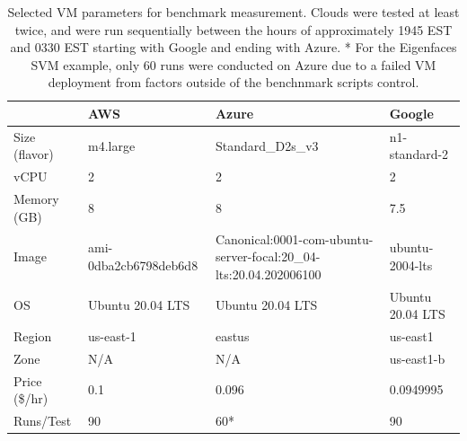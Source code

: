 \begin{table}
  
\caption{Selected VM parameters for benchmark measurement.
Clouds were tested at least twice, and were run sequentially between the
hours of approximately 1945 EST and 0330 EST starting with Google and
ending with Azure. * For the Eigenfaces SVM example, only 60 runs were
conducted on Azure due to a failed VM deployment from factors outside of
the benchnmark scripts control.}
\label{tab:1}

\begin{tabular}[]{@{}llll@{}}
\toprule
\begin{minipage}[b]{0.13\columnwidth}\raggedright
\strut
\end{minipage} & \begin{minipage}[b]{0.17\columnwidth}\raggedright
AWS\strut
\end{minipage} & \begin{minipage}[b]{0.47\columnwidth}\raggedright
Azure\strut
\end{minipage} & \begin{minipage}[b]{0.12\columnwidth}\raggedright
Google\strut
\end{minipage}\tabularnewline
\midrule
Size (flavor)
& 
m4.large
& 
Standard\_D2s\_v3 & 
n1-standard-2
\tabularnewline
vCPU & 2 & 2 & 2
\tabularnewline
Memory (GB) & 8 & 8 & 7.5
\tabularnewline
Image & ami-0dba2cb6798deb6d8
& \begin{minipage}[t]{0.80\columnwidth}\raggedright
Canonical:0001-com-ubuntu-server-focal:20\_04-lts:20.04.202006100\strut
\end{minipage} & 
ubuntu-2004-lts
\tabularnewline
OS & Ubuntu 20.04 LTS & Ubuntu 20.04 LTS & Ubuntu 20.04 LTS
\tabularnewline
Region & us-east-1 & eastus & us-east1
\tabularnewline
Zone &  N/A &  N/A & us-east1-b
\tabularnewline
Price (\$/hr)
&  0.1 & 0.096 & 0.0949995
\tabularnewline
Runs/Test
& \begin{minipage}[t]{0.17\columnwidth}\raggedright
90\strut
\end{minipage} & \begin{minipage}[t]{0.47\columnwidth}\raggedright
60*\strut
\end{minipage} & \begin{minipage}[t]{0.12\columnwidth}\raggedright
90\strut
\end{minipage}\tabularnewline
\bottomrule
\end{tabular}
\end{table}

